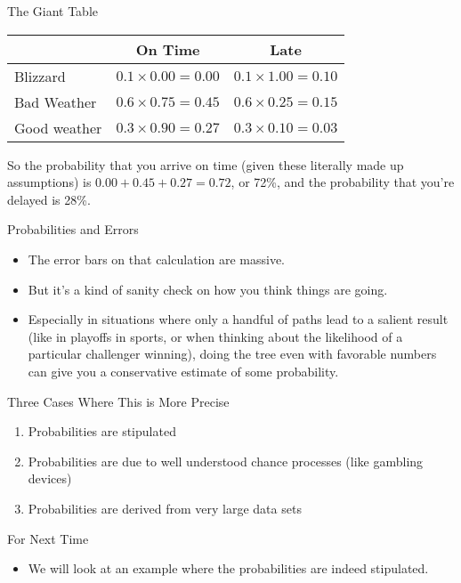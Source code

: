 \documentclass[
  ignorenonframetext,
]{beamer}
\providecommand{\tightlist}{%
  \setlength{\itemsep}{0pt}\setlength{\parskip}{0pt}}
\renewcommand{\,}{\text{, }}
\begin{document}
\begin{frame}{The Giant Table}
\protect\hypertarget{the-giant-table}{}
\begin{longtable}[]{@{}lcc@{}}
\toprule
& On Time & Late \\
\midrule
\endhead
Blizzard & \(0.1 \times 0.00 = 0.00\) & \(0.1 \times 1.00 = 0.10\) \\
Bad Weather & \(0.6 \times 0.75 = 0.45\) & \(0.6 \times 0.25 = 0.15\) \\
Good weather & \(0.3 \times 0.90 = 0.27\) &
\(0.3 \times 0.10 = 0.03\) \\
\bottomrule
\end{longtable}

So the probability that you arrive on time (given these literally made
up assumptions) is \(0.00 + 0.45 + 0.27 = 0.72\), or 72\%, and the
probability that you're delayed is 28\%.
\end{frame}

\begin{frame}{Probabilities and Errors}
\protect\hypertarget{probabilities-and-errors}{}
\begin{itemize}
\tightlist
\item
  The error bars on that calculation are massive.
\item
  But it's a kind of sanity check on how you think things are going.
\item
  Especially in situations where only a handful of paths lead to a
  salient result (like in playoffs in sports, or when thinking about the
  likelihood of a particular challenger winning), doing the tree even
  with favorable numbers can give you a conservative estimate of some
  probability.
\end{itemize}
\end{frame}

\begin{frame}{Three Cases Where This is More Precise}
\protect\hypertarget{three-cases-where-this-is-more-precise}{}
\begin{enumerate}
\tightlist
\item
  Probabilities are stipulated
\item
  Probabilities are due to well understood chance processes (like
  gambling devices)
\item
  Probabilities are derived from very large data sets
\end{enumerate}
\end{frame}

\begin{frame}{For Next Time}
\protect\hypertarget{for-next-time}{}
\begin{itemize}
\tightlist
\item
  We will look at an example where the probabilities are indeed
  stipulated.
\end{itemize}
\end{frame}
\end{document}
